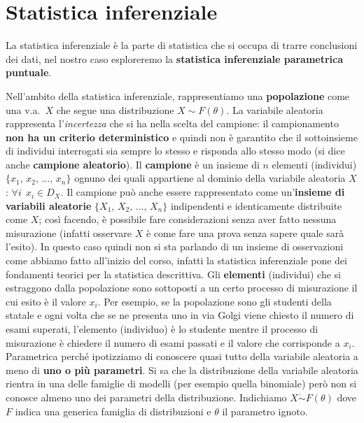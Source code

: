 \section{Statistica inferenziale}
La statistica inferenziale è la parte di statistica che si occupa di trarre conclusioni dei dati, nel nostro caso esploreremo la \textbf{statistica inferenziale parametrica puntuale}.

\noindent Nell'ambito della statistica inferenziale, rappresentiamo una \textbf{popolazione} come una v.a.\ $X$ che segue una distribuzione $X \sim F(\theta)$. La variabile aleatoria rappresenta l'\textit{incertezza} che si ha nella scelta del campione: il campionamento \textbf{non ha un criterio deterministico} e quindi non è garantito che il sottoinsieme di individui interrogati sia sempre lo stesso e risponda allo stesso modo (si dice anche \textbf{campione aleatorio}). 
Il \textbf{campione} è un insieme di $n$ elementi (individui) $\{ x_1, \, x_2, \, \dots, \, x_n \}$ ognuno dei quali appartiene al dominio della variabile aleatoria $X$: $\forall i \: \  x_i \in D_X$.
Il campione può anche essere rappresentato come un'\textbf{insieme di variabili aleatorie} $\{ X_1, \, X_2, \, \dots, \, X_n \}$ indipendenti e identicamente distribuite come $X$; così facendo, è possibile fare considerazioni senza aver fatto nessuna misurazione (infatti osservare $X$ è come fare una prova senza sapere quale sarà l'esito). In questo caso quindi non si sta parlando di un insieme di osservazioni come abbiamo fatto all'inizio del corso, infatti la statistica inferenziale pone dei fondamenti teorici per la statistica descrittiva. Gli \textbf{elementi} (individui) che si estraggono dalla popolazione sono sottoposti a un certo processo di misurazione il cui esito è il valore $x_i$. Per esempio, se la popolazione sono gli studenti della statale e ogni volta che se ne presenta uno in via Golgi viene chiesto il numero di esami superati, l'elemento (individuo) è lo studente mentre il processo di misurazione è chiedere il numero di esami passati e il valore che corrisponde a $x_i$.
\newline \newline
Parametrica perché ipotizziamo di conoscere quasi tutto della variabile aleatoria a meno di \textbf{uno o più parametri}. Si sa che la distribuzione della variabile aleatoria rientra in una delle famiglie di modelli (per esempio quella binomiale) però non si conosce almeno uno dei parametri della distribuzione. Indichiamo $X \dot{\sim} F(\theta)$ dove $F$ indica una generica famiglia di distribuzioni e $\theta$ il parametro ignoto.
